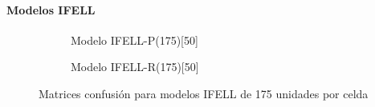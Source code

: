 \paragraph{Modelos IFELL}
\begin{figure}[H]
  \centering
  \begin{subfigure}[t]{0.48\textwidth}
      \centering
      \caption{\footnotesize \label{fig:app:confmatrix:ifell:P17550}Modelo IFELL-P(175)[50]}
  \end{subfigure}
  \hfill
  \begin{subfigure}[t]{0.48\textwidth}
      \centering
      \caption{\footnotesize \label{fig:app:confmatrix:ifell:R17550}Modelo IFELL-R(175)[50]}
  \end{subfigure}
  \caption{\label{fig:app:confmatrix:ifell:175} Matrices confusión para modelos IFELL de 175 unidades por celda}
\end{figure}

